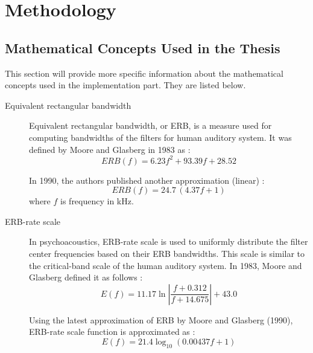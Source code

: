 \chapter{Methodology}

\section{Mathematical Concepts Used in the Thesis}\label{section:math_concepts}

This section will provide more specific information about the mathematical concepts used in the implementation part. They are listed below.

\begin{description}
	\item[Equivalent rectangular bandwidth] Equivalent rectangular bandwidth, or ERB, is a measure used for computing bandwidths of the filters for human auditory system. It was defined by Moore and Glasberg in 1983 as \cite{Moore1983}\cite{Holdsworth1988}:
	\begin{equation}
		ERB(f) = 6.23f^2 + 93.39f + 28.52
	\end{equation} 
	
	In 1990, the authors published another approximation (linear) \cite{Moore1990}\cite{Wang2006}:
	\begin{equation}
		ERB(f) = 24.7\,(4.37f + 1)
		\label{equation:ERB_1990}
	\end{equation}
	where $f$ is frequency in kHz.
	
	\item[ERB-rate scale] In psychoacoustics, ERB-rate scale is used to uniformly distribute the filter center frequencies based on their ERB bandwidths. This scale is similar to the critical-band scale of the human auditory system. In 1983, Moore and Glasberg defined it as follows \cite{Moore1983}:
	\begin{equation}
		E(f) = 11.17\ln\left|\frac{f + 0.312}{f + 14.675}\right| + 43.0
	\end{equation}
	
	Using the latest approximation of ERB by Moore and Glasberg (1990), ERB-rate scale function is approximated as \cite{Moore1990}\cite{Wang2006}:
	\begin{equation}
		E(f) = 21.4\log_{10}\left(0.00437f + 1\right)
	\end{equation}
	

\end{description}
